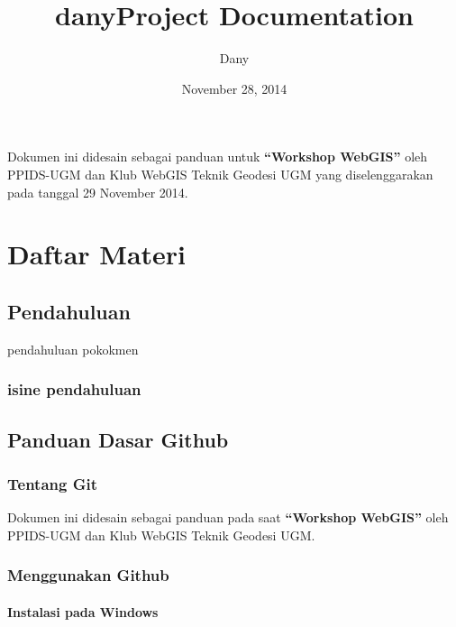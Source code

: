 \documentclass[letterpaper,10pt,english]{sphinxmanual}
\title{danyProject Documentation}
\date{November 28, 2014}
\author{Dany}
\begin{document}
\maketitle
\tableofcontents
{}\label{index::doc}


Dokumen ini didesain sebagai panduan untuk \textbf{``Workshop WebGIS''}
oleh PPIDS-UGM dan Klub WebGIS Teknik Geodesi UGM yang diselenggarakan pada
tanggal 29 November 2014.


\chapter{Daftar Materi}
\label{index:daftar-materi}\label{index:panduan-workshop-webgis-2014}\label{index:konten-workshop}

\section{Pendahuluan}
\label{pendahuluan::doc}\label{pendahuluan:pendahuluan}\label{pendahuluan:id1}
pendahuluan pokokmen


\subsection{isine pendahuluan}
\label{pendahuluan:isine-pendahuluan}\pagebreak[4]

\section{Panduan Dasar Github}
\label{git:panduan-dasar-github}\label{git:git}\label{git::doc}

\subsection{Tentang Git}
\label{git:tentang-git}
Dokumen ini didesain sebagai panduan pada saat \textbf{``Workshop WebGIS''}
oleh PPIDS-UGM dan Klub WebGIS Teknik Geodesi UGM.


\subsection{Menggunakan Github}
\label{git:menggunakan-github}

\subsubsection{Instalasi pada Windows}
\label{git:instalasi-pada-windows}
\end{document}
